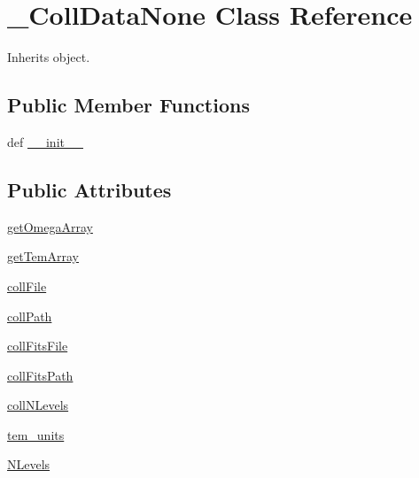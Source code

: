 \hypertarget{classpyneb_1_1core_1_1pynebcore_1_1___coll_data_none}{\section{\-\_\-\-Coll\-Data\-None Class Reference}
\label{classpyneb_1_1core_1_1pynebcore_1_1___coll_data_none}
}


Inherits object.

\subsection*{Public Member Functions}
\begin{DoxyCompactItemize}
\item 
def \hyperlink{classpyneb_1_1core_1_1pynebcore_1_1___coll_data_none_ac775ee34451fdfa742b318538164070e}{\-\_\-\-\_\-init\-\_\-\-\_\-}
\end{DoxyCompactItemize}
\subsection*{Public Attributes}
\begin{DoxyCompactItemize}
\item 
\hyperlink{classpyneb_1_1core_1_1pynebcore_1_1___coll_data_none_afa0499ea1cf0e554a36961f6e364f8af}{get\-Omega\-Array}
\item 
\hyperlink{classpyneb_1_1core_1_1pynebcore_1_1___coll_data_none_a537334a5778aefbe7b0590b641bc1b57}{get\-Tem\-Array}
\item 
\hyperlink{classpyneb_1_1core_1_1pynebcore_1_1___coll_data_none_ab1799c18dddda68ec8651caf93c90e40}{coll\-File}
\item 
\hyperlink{classpyneb_1_1core_1_1pynebcore_1_1___coll_data_none_adde256ff299a719e21c78ff9aad1b68c}{coll\-Path}
\item 
\hyperlink{classpyneb_1_1core_1_1pynebcore_1_1___coll_data_none_a1570b17843b0152b836049295bedb8ec}{coll\-Fits\-File}
\item 
\hyperlink{classpyneb_1_1core_1_1pynebcore_1_1___coll_data_none_aba92b77e6304fd2d31a920d7cd3a196d}{coll\-Fits\-Path}
\item 
\hyperlink{classpyneb_1_1core_1_1pynebcore_1_1___coll_data_none_a6bf0c64181b0f528302aeeaa628638dd}{coll\-N\-Levels}
\item 
\hyperlink{classpyneb_1_1core_1_1pynebcore_1_1___coll_data_none_a538e48ab1f2ca63dbe55abea69ca2242}{tem\-\_\-units}
\item 
\hyperlink{classpyneb_1_1core_1_1pynebcore_1_1___coll_data_none_a4d45fe163c2108853ab418386bf4da56}{N\-Levels}
\end{DoxyCompactItemize}



